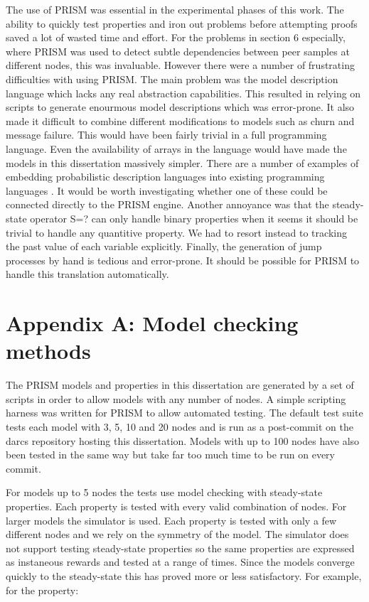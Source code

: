 \documentclass[a4paper,10pt]{article}
\begin{document}
The use of PRISM was essential in the experimental phases of this work. The ability to quickly test properties and iron out problems before attempting proofs saved a lot of wasted time and effort. For the problems in section 6 especially, where PRISM was used to detect subtle dependencies between peer samples at different nodes, this was invaluable. However there were a number of frustrating difficulties with using PRISM. The main problem was the model description language which lacks any real abstraction capabilities. This resulted in relying on scripts to generate enourmous model descriptions which was error-prone. It also made it difficult to combine different modifications to models such as churn and message failure. This would have been fairly trivial in a full programming language. Even the availability of arrays in the language would have made the models in this dissertation massively simpler. There are a number of examples of embedding probabilistic description languages into existing programming languages \cite{pfp, ocaml_cont}. It would be worth investigating whether one of these could be connected directly to the PRISM engine. Another annoyance was that the steady-state operator S=? can only handle binary properties when it seems it should be trivial to handle any quantitive property. We had to resort instead to tracking the past value of each variable explicitly. Finally, the generation of jump processes by hand is tedious and error-prone. It should be possible for PRISM to handle this translation automatically.

\section{Appendix A: Model checking methods}

The PRISM models and properties in this dissertation are generated by a set of scripts in order to allow models with any number of nodes. A simple scripting harness was written for PRISM to allow automated testing. The default test suite tests each model with 3, 5, 10 and 20 nodes and is run as a post-commit on the darcs repository hosting this dissertation. Models with up to 100 nodes have also been tested in the same way but take far too much time to be run on every commit. 

For models up to 5 nodes the tests use model checking with steady-state properties. Each property is tested with every valid combination of nodes. For larger models the simulator is used. Each property is tested with only a few different nodes and we rely on the symmetry of the model. The simulator does not support testing steady-state properties so the same properties are expressed as instaneous rewards and tested at a range of times. Since the models converge quickly to the steady-state this has proved more or less satisfactory. For example, for the property:
\end{document}
